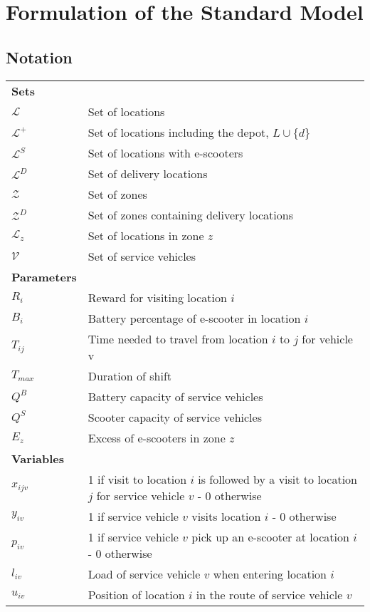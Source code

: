 \section{Formulation of the Standard Model}\label{formulation_standard}
\stoptocwriting
\subsection{Notation}
\begin{tabular}{p{1.5cm} p{12.5cm}}
    \textbf{Sets} & \\
    $\mathcal{L}$ & Set of locations \\
    $\mathcal{L}^{+}$ & Set of locations including the depot, $L \cup \{d\}$ \\
    $\mathcal{L}^{S}$ & Set of locations with e-scooters \\
    $\mathcal{L}^{D}$ & Set of delivery locations \\
    $\mathcal{Z}$ & Set of zones \\
    $\mathcal{Z}^D$ & Set of zones containing delivery locations \\
    $\mathcal{L}_{z}$ & Set of locations in zone $z$ \\
    $\mathcal{V}$ & Set of service vehicles \\
    \textbf{Parameters} \\
    $R_{i}$ & Reward for visiting location $i$ \\
    $B_{i}$ & Battery percentage of e-scooter in location $i$ \\
    $T_{ij}$ & Time needed to travel from location $i$ to $j$ for vehicle v\\
    $T_{max}$ & Duration of shift \\
    $Q^{B}$ & Battery capacity of service vehicles \\
    $Q^{S}$ & Scooter capacity of service vehicles \\
    $E_z$ & Excess of e-scooters in zone $z$ \\
    \textbf{Variables} \\
    $x_{ijv}$ & 1 if visit to location $i$ is followed by a visit to location $j$ for service vehicle $v$ - 0 otherwise \\
    $y_{iv}$ & 1 if service vehicle $v$ visits location $i$  - 0 otherwise \\
    $p_{iv}$ & 1 if service vehicle $v$ pick up an e-scooter at location $i$ - 0 otherwise \\
    $l_{iv}$ & Load of service vehicle $v$ when entering location $i$ \\
    $u_{iv}$ & Position of location $i$ in the route of service vehicle $v$ \\
\end{tabular}
\newpage
